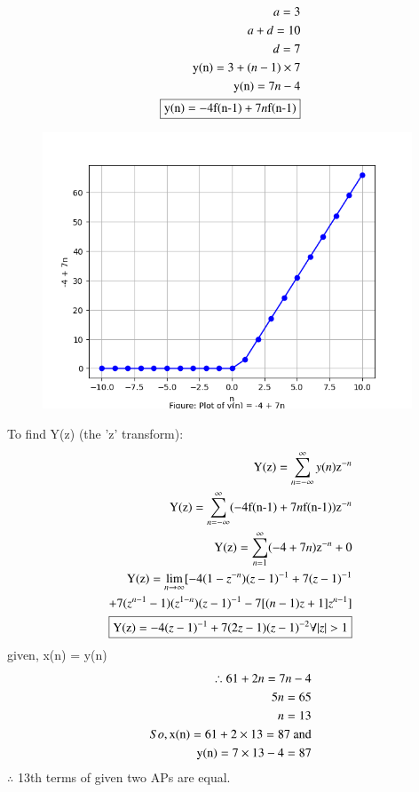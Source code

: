 \documentclass[journal,12pt,twocolumn]{IEEEtran}
\theoremstyle{remark}
\begin{document}
\begin{enumerate}
\begin{align}
\notag a = 3 \\
\notag a+d = 10\\
\notag d = 7\\
\notag \text{y(n)} = 3 + (n-1)\times7\\
\text{y(n)} = 7n - 4 \label{eq:4}\\
\boxed{\text{y(n)} = -4\text{f(n-1)} + 7n\text{f(n-1)}}
\end{align}
\begin{figure}
    \includegraphics[width = 11cm]{Figure_2.png}
\end{figure}
To find Y(z) (the 'z' transform):\\
\begin{align}
\text{Y(z)} = \sum_{n=-\infty}^{\infty} y(n)\text{z}^{-n}\\
\notag \text{Y(z)} = \sum_{n=-\infty}^{\infty} (-4\text{f(n-1)} + 7n\text{f(n-1)})\text{z}^{-n}\\
\notag \text{Y(z)} = \sum_{n=1}^{\infty} (-4 + 7n)\text{z}^{-n} + 0\\
\notag \text{Y(z)} = \lim_{n\to\infty} [-4(1-z^{-n})(z-1)^{-1}+ 7(z-1)^{-1}\\
+ 7(z^{n-1}-1)(z^{1-n})(z-1)^{-1}-7[(n-1)z+1]z^{n-1}]\\
\boxed{\text{Y(z)} = -4(z-1)^{-1} + 7(2z-1)(z-1)^{-2} \forall  |z|>1}
\end{align}
given, x(n) = y(n)\\
\begin{align}
\therefore 61 + 2n = 7n -4\\
\notag 5n = 65\\
n = 13\\
\notag So, \text{x(n)} = 61 + 2\times13 = 87 \text{ and}\\
\notag \text{y(n)} = 7\times13 - 4 = 87
\end{align}
$ \therefore$ 13th terms of given two APs are equal.\\\\
\end{enumerate}
\end{document}
